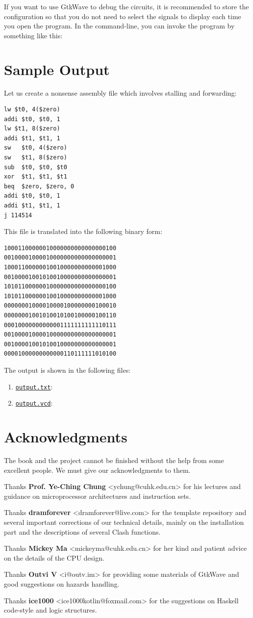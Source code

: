 \documentclass[a4paper,12pt, oneside]{book}
\begin{document}
If you want to use GtkWave to debug the circuits, it is recommended to store the configuration so that you do not need to select the signals to display each time you open the program. In the command-line, you can invoke the program by something like this:

\chapter{Sample Output}
Let us create a nonsense assembly file which involves stalling and forwarding:
\begin{verbatim}
lw $t0, 4($zero)
addi $t0, $t0, 1
lw $t1, 8($zero)
addi $t1, $t1, 1
sw   $t0, 4($zero)
sw   $t1, 8($zero)
sub  $t0, $t0, $t0
xor  $t1, $t1, $t1
beq  $zero, $zero, 0
addi $t0, $t0, 1
addi $t1, $t1, 1
j 114514
\end{verbatim}
This file is translated into the following binary form:
\begin{verbatim}
10001100000010000000000000000100
00100001000010000000000000000001
10001100000010010000000000001000
00100001001010010000000000000001
10101100000010000000000000000100
10101100000010010000000000001000
00000001000010000100000000100010
00000001001010010100100000100110
00010000000000001111111111110111
00100001000010000000000000000001
00100001001010010000000000000001
00001000000000000110111111010100
\end{verbatim}
The output is shown in the following files:
\begin{enumerate}
	\item \href{https://yifan.cowtransfer.com/s/166018e0ad394b}{\texttt{output.txt}}: 
	\item \href{https://yifan.cowtransfer.com/s/e10ff6693c3149}{\texttt{output.vcd}}: 
\end{enumerate}
\chapter{Acknowledgments}
The book and the project cannot be finished without the help from some excellent people. We must give our acknowledgments to them.

Thanks \textbf{Prof. Ye-Ching Chung} <ychung@cuhk.edu.cn> for his lectures and guidance on microprocessor architectures and instruction sets.

Thanks \textbf{dramforever} <dramforever@live.com> for the template repository and several important corrections of our technical details, mainly on the installation part and the descriptions of several Clash functions.

Thanks \textbf{Mickey Ma} <mickeyma@cuhk.edu.cn> for her kind and patient advice on the details of the CPU design.

Thanks \textbf{Outvi V} <i@outv.im> for providing some materials of GtkWave and good suggestions on hazards handling.

Thanks \textbf{ice1000} <ice1000kotlin@foxmail.com> for the suggestions on Haskell code-style and logic structures.
\end{document}
